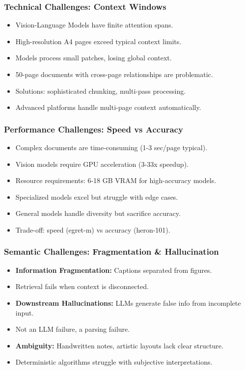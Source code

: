 \begin{frame}[fragile]\frametitle{Technical Challenges: Context Windows}
      \begin{itemize}
        \item Vision-Language Models have finite attention spans.
        \item High-resolution A4 pages exceed typical context limits.
        \item Models process small patches, losing global context.
        \item 50-page documents with cross-page relationships are problematic.
        \item Solutions: sophisticated chunking, multi-pass processing.
        \item Advanced platforms handle multi-page context automatically.
      \end{itemize}
\end{frame}

\begin{frame}[fragile]\frametitle{Performance Challenges: Speed vs Accuracy}
      \begin{itemize}
        \item Complex documents are time-consuming (1-3 sec/page typical).
        \item Vision models require GPU acceleration (3-33x speedup).
        \item Resource requirements: 6-18 GB VRAM for high-accuracy models.
        \item Specialized models excel but struggle with edge cases.
        \item General models handle diversity but sacrifice accuracy.
        \item Trade-off: speed (egret-m) vs accuracy (heron-101).
      \end{itemize}
\end{frame}

\begin{frame}[fragile]\frametitle{Semantic Challenges: Fragmentation \& Hallucination}
      \begin{itemize}
        \item \textbf{Information Fragmentation:} Captions separated from figures.
        \item Retrieval fails when context is disconnected.
        \item \textbf{Downstream Hallucinations:} LLMs generate false info from incomplete input.
        \item Not an LLM failure, a parsing failure.
        \item \textbf{Ambiguity:} Handwritten notes, artistic layouts lack clear structure.
        \item Deterministic algorithms struggle with subjective interpretations.
      \end{itemize}
\end{frame}


